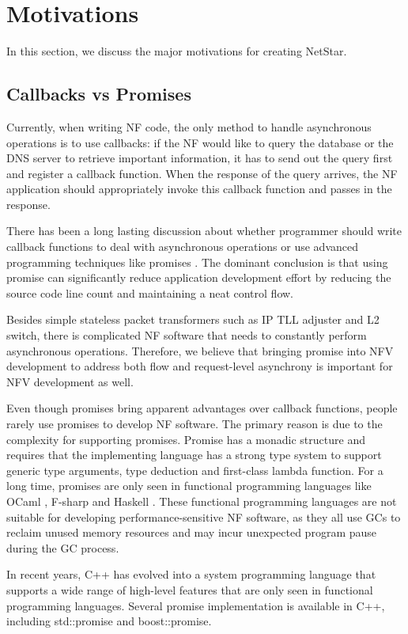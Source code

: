 \section{Motivations}

In this section, we discuss the major motivations for creating NetStar.

\subsection {Callbacks vs Promises}

Currently, when writing NF code, the only method to handle asynchronous operations is to use callbacks: if the NF would like to query the database or the DNS server to retrieve important information, it has to send out the query first and register a callback function. When the response of the query arrives, the NF application should appropriately invoke this callback function and passes in the response. 

There has been a long lasting discussion about whether programmer should write callback functions to deal with asynchronous operations or use advanced programming techniques like promises \cite{}. The dominant conclusion is that using promise can significantly reduce application development effort by reducing the source code line count and maintaining a neat control flow.

Besides simple stateless packet transformers such as IP TLL adjuster and L2 switch, there is complicated NF software that needs to constantly perform asynchronous operations. Therefore, we believe that bringing promise into NFV development to address both flow and request-level asynchrony is important for NFV development as well.

Even though promises bring apparent advantages over callback functions, people rarely use promises to develop NF software. The primary reason is due to the complexity for supporting promises. Promise has a monadic structure \cite{} and requires that the implementing language has a strong type system to support generic type arguments, type deduction and first-class lambda function. For a long time, promises are only seen in functional programming languages like OCaml \cite{}, F-sharp \cite{} and Haskell \cite{}. These functional programming languages are not suitable for developing performance-sensitive NF software, as they all use GCs to reclaim unused memory resources and may incur unexpected program pause during the GC process.


In recent years, C++ \cite{} has evolved into a system programming language that supports a wide range of high-level features that are only seen in functional programming languages. Several promise implementation \cite{} is available in C++, including std::promise and boost::promise.


